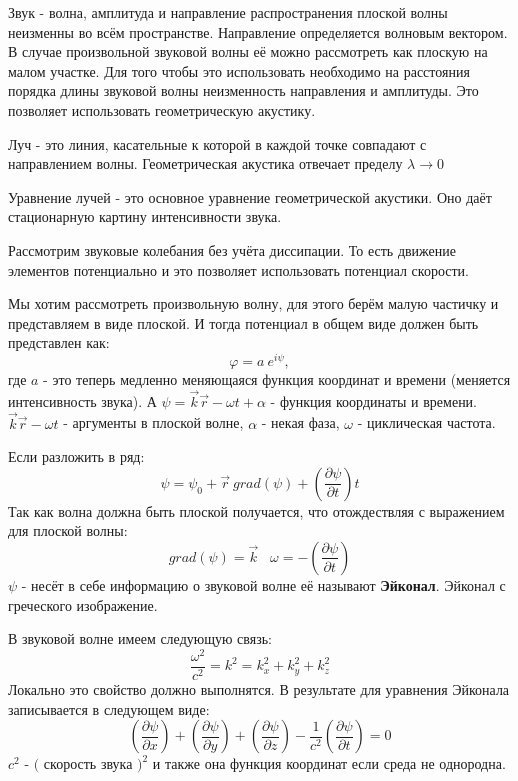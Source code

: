 \documentclass[14pt,a4paper,oneside]{extarticle}	%
\newcommand{\bracket}[1] {\left( #1 \right) } %
\newcommand{\dif}[2] {\bracket{ \frac{\partial #1}{\partial #2} }}
\begin{document}
Звук - волна, амплитуда и направление распространения плоской волны неизменны во всём пространстве.
Направление определяется волновым вектором.
В случае произвольной звуковой волны её можно рассмотреть как плоскую на малом участке.
Для того чтобы это использовать необходимо на расстояния порядка длины звуковой волны неизменность направления и амплитуды.
Это позволяет использовать геометрическую акустику.

Луч - это линия, касательные к которой в каждой точке совпадают с направлением волны.
Геометрическая акустика отвечает пределу $ \lambda\longrightarrow0 $ 

Уравнение лучей - это основное уравнение геометрической акустики.
Оно даёт стационарную картину интенсивности звука.

Рассмотрим звуковые колебания без учёта диссипации. То есть движение элементов потенциально и это позволяет использовать потенциал скорости.

Мы хотим рассмотреть произвольную волну, для этого берём малую частичку и представляем в виде плоской.
И тогда потенциал в общем виде должен быть представлен как:
\begin{equation*}
\varphi = a \:e^{i\psi},
\end{equation*}
где $ a $ - это теперь медленно меняющаяся функция координат  и времени (меняется интенсивность звука). А $ \psi = \vec{k}\vec{r} - \omega t + \alpha $ - функция координаты и времени. $ \vec{k}\vec{r} - \omega t $ - аргументы в плоской волне, $ \alpha $ - некая фаза, $ \omega $ - циклическая частота.

Если разложить в ряд: 
\begin{equation*}
\psi = \psi_{0} + \vec{r}\:grad(\psi)+\dif{\psi}{t}t
\end{equation*}
Так как волна должна быть плоской получается, что отождествляя с выражением для плоской волны:
\begin{equation*}
grad(\psi) = \vec{k} \;\;\; \omega = -\dif{\psi}{t}
\end{equation*}
$ \psi $ - несёт в себе информацию о звуковой волне её называют \textbf{Эйконал}.
Эйконал с греческого изображение.

В звуковой волне имеем следующую связь:
\begin{equation*}
\frac{\omega^{2}}{c^{2}} = k^{2} =  k_{x}^{2} + k_{y}^{2} + k_{z}^{2}
\end{equation*}
Локально это свойство должно выполнятся.
В результате для уравнения Эйконала записывается в следующем виде:
\begin{equation*}
\dif{\psi}{x} + \dif{\psi}{y} + \dif{\psi}{z} - \frac{1}{c^{2}}\dif{\psi}{t} = 0
\end{equation*}
$ c^{2} $ - $  ( $ скорость звука $ )^{2} $ и также она функция координат если среда не однородна.
\end{document}
